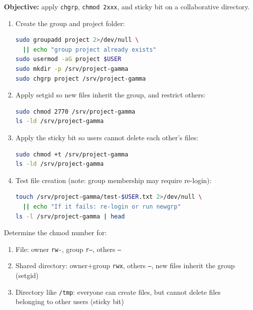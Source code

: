 \textbf{Objective:} apply \texttt{chgrp}, \texttt{chmod 2xxx}, and sticky bit
on a collaborative directory.

\begin{enumerate}
    \item Create the group and project folder:
\begin{lstlisting}[language=bash, caption={Creating the group and project folder}]
sudo groupadd project 2>/dev/null \
  || echo "group project already exists"
sudo usermod -aG project $USER
sudo mkdir -p /srv/project-gamma
sudo chgrp project /srv/project-gamma
\end{lstlisting}

    \item Apply setgid so new files inherit the group, and restrict others:
\begin{lstlisting}[language=bash, caption={Setgid on the project directory}]
sudo chmod 2770 /srv/project-gamma
ls -ld /srv/project-gamma
\end{lstlisting}

    \item Apply the sticky bit so users cannot delete each other's files:
\begin{lstlisting}[language=bash, caption={Sticky bit on the collaborative directory}]
sudo chmod +t /srv/project-gamma
ls -ld /srv/project-gamma
\end{lstlisting}

    \item Test file creation (note: group membership may require re-login):
\begin{lstlisting}[language=bash, caption={Testing collaborative access}]
touch /srv/project-gamma/test-$USER.txt 2>/dev/null \
  || echo "If it fails: re-login or run newgrp"
ls -l /srv/project-gamma | head
\end{lstlisting}
\end{enumerate}

\begin{exercisebox}[4.1]
Determine the chmod number for:
\begin{enumerate}
    \item File: owner \texttt{rw-}, group \texttt{r--}, others \texttt{---}
    \item Shared directory: owner+group \texttt{rwx}, others \texttt{---}, new files inherit the group (setgid)
    \item Directory like \texttt{/tmp}: everyone can create files, but cannot delete files belonging to other users (sticky bit)
\end{enumerate}
\end{exercisebox}

